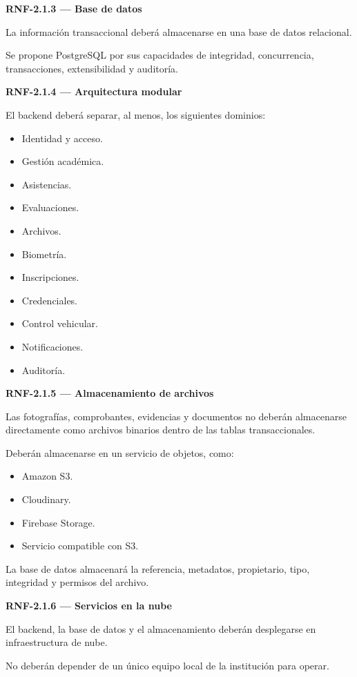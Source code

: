 \documentclass[12pt,a4paper]{article}
\newcommand{\RNF}[1]{\textbf{\color{secondary}RNF-#1}}
\newenvironment{requisito}[1]
{
\begin{center}
\begin{minipage}{0.96\textwidth}
\colorbox{requirement}{
\begin{minipage}{0.94\textwidth}
\textbf{#1}
\end{minipage}
}
\vspace{2mm}
}
{
\end{minipage}
\end{center}
}
\begin{document}
\begin{requisito}{\RNF{2.1.3} --- Base de datos}
La información transaccional deberá almacenarse en una base de datos relacional.

Se propone PostgreSQL por sus capacidades de integridad, concurrencia,
transacciones, extensibilidad y auditoría.
\end{requisito}

\begin{requisito}{\RNF{2.1.4} --- Arquitectura modular}
El backend deberá separar, al menos, los siguientes dominios:

\begin{itemize}[leftmargin=*]
\item Identidad y acceso.
\item Gestión académica.
\item Asistencias.
\item Evaluaciones.
\item Archivos.
\item Biometría.
\item Inscripciones.
\item Credenciales.
\item Control vehicular.
\item Notificaciones.
\item Auditoría.
\end{itemize}
\end{requisito}

\begin{requisito}{\RNF{2.1.5} --- Almacenamiento de archivos}
Las fotografías, comprobantes, evidencias y documentos no deberán almacenarse
directamente como archivos binarios dentro de las tablas transaccionales.

Deberán almacenarse en un servicio de objetos, como:

\begin{itemize}[leftmargin=*]
\item Amazon S3.
\item Cloudinary.
\item Firebase Storage.
\item Servicio compatible con S3.
\end{itemize}

La base de datos almacenará la referencia, metadatos, propietario, tipo,
integridad y permisos del archivo.
\end{requisito}

\begin{requisito}{\RNF{2.1.6} --- Servicios en la nube}
El backend, la base de datos y el almacenamiento deberán desplegarse en
infraestructura de nube.

No deberán depender de un único equipo local de la institución para operar.
\end{requisito}
\end{document}
